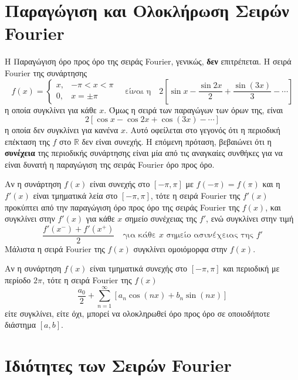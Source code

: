 \documentclass[a4paper,table]{report}
\begin{document}
\section{Παραγώγιση και Ολοκλήρωση Σειρών \textlatin{Fourier}}

Η Παραγώγιση όρο προς όρο της σειράς \textlatin{Fourier}, γενικώς, \textbf{δεν} επιτρέπεται.
Η σειρά \textlatin{Fourier} της συνάρτησης
\[
  f(x) = 
  \begin{cases}
    x, & - \pi < x < \pi \\
    0, & x= \pm \pi
  \end{cases} \quad \text{είναι η} \quad 
  2\left[ \sin{x} - \frac{\sin{2x}}{2} + \frac{\sin{(3x)}}{3} - \cdots\right]
\] 
η οποία συγκλίνει για κάθε $x$. Όμως η σειρά των παραγώγων των όρων της, είναι 
\[
  2[\cos{x} - \cos{2x} + \cos{(3x)} - \cdots] 
\] 
η οποία δεν συγκλίνει για κανένα $x$. Αυτό οφείλεται στο γεγονός ότι η περιοδική 
επέκταση της $f$ στο $\mathbb{R}$ δεν είναι συνεχής. Η επόμενη πρόταση, βεβαιώνει ότι 
η \textbf{συνέχεια} της περιοδικής συνάρτησης είναι μία από τις αναγκαίες συνθήκες για 
να είναι δυνατή η παραγώγιση της σειράς \textlatin{Fourier} όρο προς όρο.

\begin{thm}[Παραγώγισης]
  Αν η συνάρτηση $ f(x) $ είναι συνεχής στο $ [- \pi , \pi] $ με $ f(- \pi ) = f(\pi) $ 
  και η $ f'(x) $ είναι τμηματικά λεία στο $ [- \pi , \pi] $, τότε η σειρά
  \textlatin{Fourier} 
  της $ f'(x) $ προκύπτει από την παραγώγιση όρο προς όρο της σειράς
  \textlatin{Fourier} της 
  $ f(x) $, και συγκλίνει στην $ f'(x) $ για κάθε $x$ σημείο συνέχειας της $f'$, 
  ενώ συγκλίνει στην τιμή
  \[
    \frac{f'(x^{-})+f'(x^{+})}{2}   \quad \text{για κάθε $x$ σημείο ασυνέχειας της $f'$} 
  \] 
  Μάλιστα η σειρά \textlatin{Fourier} της $ f(x) $ συγκλίνει ομοιόμορφα στην $ f(x) $.
\end{thm}

\begin{thm}[Ολοκλήρωσης]
  Αν η συνάρτηση $ f(x) $ είναι τμηματικά συνεχής στο $ [- \pi , \pi] $ και περιοδική 
  με περίοδο $ 2 \pi $, τότε η σειρά \textlatin{Fourier} της $ f(x) $ 
  \[
    \frac{a_{0}}{2} + \sum_{n=1}^{\infty} \left[a_{n} \cos{(nx)} + b_{n} \sin{(nx)}\right] 
  \] 
  είτε συγκλίνει, είτε όχι, μπορεί να ολοκληρωθεί όρο προς όρο σε οποιοδήποτε διάστημα 
  $ [a,b] $.
\end{thm}



\section{Ιδιότητες των Σειρών \textlatin{Fourier}}
\end{document}
